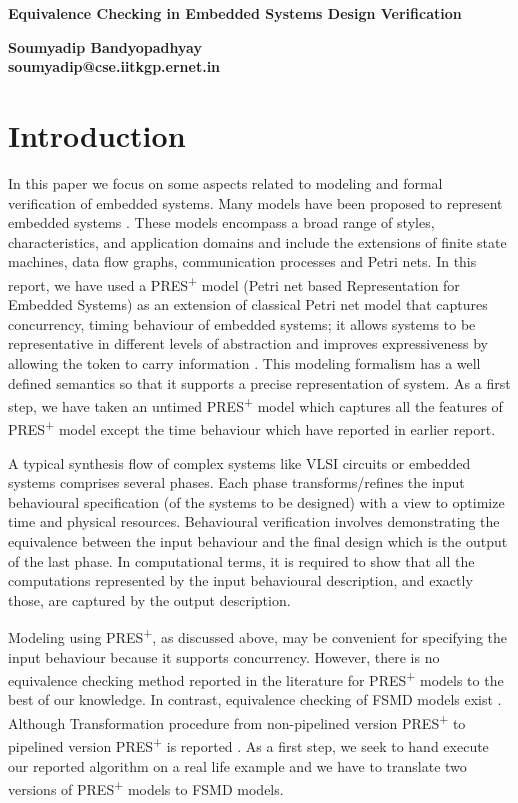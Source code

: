 \documentclass[9pt,executive]{article}
\def\presp{PRES\textsuperscript{+}}
\def\fsmd{FSMD}
\def\presp{PRES\textsuperscript{+}}
\def\fsmd{FSMD}
\begin{document}
                                                      
\begin{center}
{\bf \LARGE  Equivalence Checking in Embedded Systems Design Verification}
\end{center}
\vspace*{24pt}
\begin{center}
 {\Large \bf Soumyadip Bandyopadhyay}\\
\vspace*{12pt} 
{\Large \bf soumyadip@cse.iitkgp.ernet.in}
\end{center}
\vspace*{24pt}


\section{Introduction}
In this paper we focus on some aspects related to modeling and formal verification of embedded systems.
Many models have been proposed to represent embedded systems \cite{sedwads} \cite{peles}. 
These models encompass a broad range of styles, characteristics, and application domains and include 
the extensions of finite state machines, data flow graphs, communication processes and Petri nets. 
In this report, we have used a {\presp} model (Petri net based Representation for Embedded Systems)
as an extension of classical Petri net model that captures concurrency, timing behaviour of
embedded systems; it allows systems to be representative in different levels of
abstraction and improves expressiveness by allowing the token to carry information
\cite{zebo}. This modeling formalism has a well defined semantics so that it supports
a precise representation of system. As a first step, we have taken an untimed {\presp}
model which captures all the features of {\presp} model except the time behaviour which have 
reported in earlier report.

   A typical synthesis flow of complex systems like VLSI circuits or embedded systems
comprises several phases. Each phase transforms/refines the input behavioural
specification (of the systems to be designed) with a view to optimize time and
physical resources. Behavioural verification involves demonstrating the equivalence
between the input behaviour and the final design which is the output of the last phase.
In computational terms, it is required to show that all the computations represented
by the input behavioural description, and exactly those, are captured by the output
description. 


  Modeling using {\presp}, as discussed above, may be convenient for specifying the input
behaviour because it supports concurrency. However, there is no equivalence checking
method reported in the literature for {\presp} models to the best of our knowledge.
In contrast, equivalence checking of {\fsmd} models exist \cite{ChandanKarfa}. Although
Transformation procedure from non-pipelined version {\presp} to pipelined version {\presp} is reported \cite{zebo}. 
As a first step, we seek to hand execute our reported algorithm on a real life example and we have to translate 
two versions of {\presp} models to {\fsmd} models. 
\end{document}
